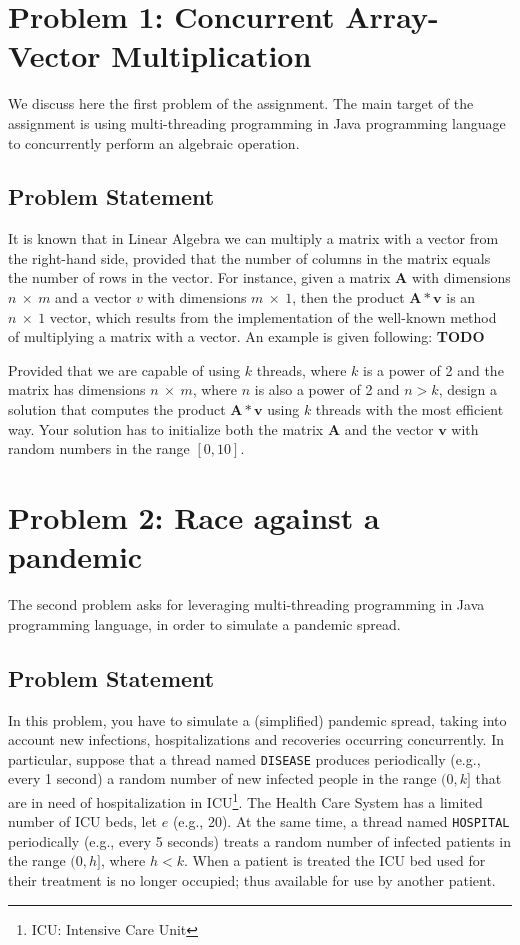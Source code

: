 \documentclass[acmlarge]{acmart}
\newcommand{\todo}{{\color{red}\textbf{TODO} }}
\newcommand{\disease}{{\small \texttt{DISEASE}} }
\newcommand{\hospital}{{\small \texttt{HOSPITAL}} }
\begin{document}
\section{Problem 1: Concurrent Array-Vector Multiplication}
\label{section:problem1}
We discuss here the first problem of the assignment. The main target of the assignment is using multi-threading programming in Java programming language to concurrently perform an algebraic operation.
\subsection{Problem Statement}
It is known that in Linear Algebra we can multiply a matrix with a vector from the right-hand side, provided that the number of columns in the matrix equals the number of rows in the vector. For instance, given a matrix $\mathbf{A}$ with dimensions $n~\times~m$ and a vector $v$ with dimensions $m~\times~1$, then the product $\mathbf{A}*\mathbf{v}$ is an $n~\times~1$ vector, which results from the implementation of the well-known method of multiplying a matrix with a vector. An example is given following: \todo

Provided that we are capable of using $k$ threads, where $k$ is a power of 2 and the matrix has dimensions $n~\times~m$, where $n$ is also a power of 2 and $n>k$, design a solution that computes the product $\mathbf{A}*\mathbf{v}$ using $k$ threads with the most efficient way. Your solution has to initialize both the matrix $\mathbf{A}$ and the vector $\mathbf{v}$ with random numbers in the range $[0, 10]$.

\section{Problem 2: Race against a pandemic}
\label{section:problem2}
The second problem asks for leveraging multi-threading programming in Java programming language, in order to simulate a pandemic spread.
\subsection{Problem Statement}
In this problem, you have to simulate a (simplified) pandemic spread, taking into account new infections, hospitalizations and recoveries occurring concurrently. In particular, suppose that a thread named \disease produces periodically (e.g., every 1 second) a random number of new infected people in the range $(0, k]$ that are in need of hospitalization in ICU\footnote{ICU: Intensive Care Unit}. The Health Care System has a limited number of ICU beds, let $e$ (e.g., 20). At the same time, a thread named \hospital periodically (e.g., every 5 seconds) treats a random number of infected patients in the range $(0, h]$, where $h<k$. When a patient is treated the ICU bed used for their treatment is no longer occupied; thus available for use by another patient.
\end{document}
